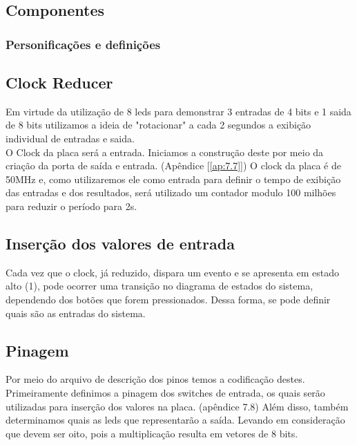     \subsection{Componentes}
    
    \subsubsection{Personificações e definições}
    
    \subsection*{Clock Reducer}
   
    Em virtude da utilização de 8 leds para demonstrar 3 entradas de 4 bits e 1 saida de 8 bits utilizamos a ideia de "rotacionar" a cada 2 segundos a exibição individual de entradas e saida.\\
    
    O Clock da placa será a entrada. Iniciamos a construção deste por meio da criação da porta de saída e entrada. (Apêndice [\ref{ap:7.7}]) O clock da placa é de 50MHz e, como utilizaremos ele como entrada para definir o tempo de exibição das entradas e dos resultados, será utilizado um contador modulo 100 milhões para reduzir o período para 2s.
    \\
    
    \subsection*{Inserção dos valores de entrada}
    Cada vez que o clock, já reduzido, dispara um evento e se apresenta em estado alto (1), pode ocorrer uma transição no diagrama de estados do sistema, dependendo dos botões que forem pressionados. Dessa forma, se pode definir quais são as entradas do sistema.
        
    \subsection*{Pinagem}
    
    Por meio do arquivo de descrição dos pinos temos a codificação destes. Primeiramente definimos a pinagem dos switches de entrada, os quais serão utilizadas para inserção dos valores na placa. (apêndice 7.8) Além disso, também determinamos quais as leds que representarão a saída. Levando em consideração que devem ser oito, pois a multiplicação resulta em vetores de 8 bits. 
    
